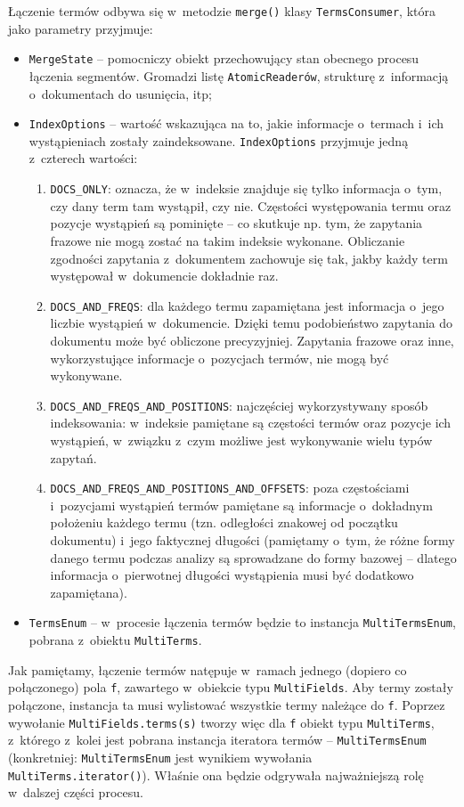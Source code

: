 Łączenie termów odbywa się w~metodzie \texttt{merge()} klasy \texttt{TermsConsumer}, która jako parametry przyjmuje:
\begin{itemize}
 \item \texttt{MergeState} -- pomocniczy obiekt przechowujący stan obecnego procesu łączenia segmentów. Gromadzi listę \texttt{AtomicReaderów}, strukturę z~informacją o~dokumentach do usunięcia, itp;
 \item \texttt{IndexOptions} -- wartość wskazująca na to, jakie informacje o~termach i~ich wystąpieniach zostały zaindeksowane. \texttt{IndexOptions} przyjmuje jedną z~czterech wartości:
 \begin{enumerate}
  \item \texttt{DOCS\_ONLY}: oznacza, że w~indeksie znajduje się tylko informacja o~tym, czy dany term tam wystąpił, czy nie. Częstości występowania termu oraz pozycje wystąpień są pominięte -- co skutkuje np. tym, że zapytania frazowe nie mogą zostać na takim indeksie wykonane. Obliczanie zgodności zapytania z~dokumentem zachowuje się tak, jakby każdy term występował w~dokumencie dokładnie raz.
  \item \texttt{DOCS\_AND\_FREQS}: dla każdego termu zapamiętana jest informacja o~jego liczbie wystąpień w~dokumencie. Dzięki temu podobieństwo zapytania do dokumentu może być obliczone precyzyjniej. Zapytania frazowe oraz inne, wykorzystujące informacje o~pozycjach termów, nie mogą być wykonywane.
  \item \texttt{DOCS\_AND\_FREQS\_AND\_POSITIONS}: najczęściej wykorzystywany sposób indeksowania: w~indeksie pamiętane są częstości termów oraz pozycje ich wystąpień, w~związku z~czym możliwe jest wykonywanie wielu typów zapytań.
  \item \texttt{DOCS\_AND\_FREQS\_AND\_POSITIONS\_AND\_OFFSETS}: poza częstościami i~pozycjami wystąpień termów pamiętane są informacje o~dokładnym położeniu każdego termu (tzn. odległości znakowej od początku dokumentu) i~jego faktycznej długości (pamiętamy o~tym, że różne formy danego termu podczas analizy są sprowadzane do formy bazowej -- dlatego informacja o~pierwotnej długości wystąpienia musi być dodatkowo zapamiętana).
 \end{enumerate}
 \item \texttt{TermsEnum} -- w~procesie łączenia termów będzie to instancja \texttt{MultiTermsEnum}, pobrana z~obiektu \texttt{MultiTerms}.
\end{itemize}

Jak pamiętamy, łączenie termów natępuje w~ramach jednego (dopiero co połączonego) pola \texttt{f}, zawartego w~obiekcie typu \texttt{MultiFields}. Aby termy zostały połączone, instancja ta musi wylistować wszystkie termy należące do \texttt{f}. Poprzez wywołanie \texttt{MultiFields.terms(s)} tworzy więc dla \texttt{f} obiekt typu \texttt{MultiTerms}, z~którego z~kolei jest pobrana instancja iteratora termów -- \texttt{MultiTermsEnum} (konkretniej: \texttt{MultiTermsEnum} jest wynikiem wywołania \texttt{MultiTerms.iterator()}). Właśnie ona będzie odgrywała najważniejszą rolę w~dalszej części procesu.


